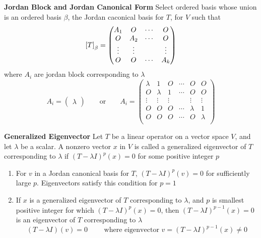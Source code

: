 \documentclass[11pt]{article}
\begin{document}




\begin{defn*}
    \textbf{Jordan Block and Jordan Canonical Form} Select ordered basis whose union is an ordered basis $\beta$, the Jordan caconical basis for $T$, for $V$ such that 
    \[
        \left[ T \right]_{\beta} = 
        \begin{pmatrix}
            A_1 & O & \cdots & O \\
            O & A_2 & \cdots & O \\
            \vdots & \vdots & & \vdots \\
            O & O & \cdots & A_k \\ 
        \end{pmatrix}    
    \]
    where $A_i$ are jordan block corresponding to $\lambda$
    \[
        A_i = 
        \begin{pmatrix}
            \lambda
        \end{pmatrix}
        \qquad 
        \text{or}
        \qquad 
        A_i = 
        \begin{pmatrix}
            \lambda & 1 & O & \cdots & O & O \\
            O & \lambda & 1 & \cdots & O & O \\
            \vdots & \vdots & \vdots & & \vdots & \vdots \\
            O & O & O & \cdots & \lambda & 1 \\ 
            O & O & O & \cdots & O & \lambda \\ 
        \end{pmatrix}
    \]
\end{defn*}


\begin{defn*}
    \textbf{Generalized Eigenvector} Let $T$ be a linear operator on a vector space $V$, and let $\lambda$ be a scalar. A nonzero vector $x$ in $V$ is called a generalized eigenvector of $T$ corresponding to $\lambda$ if $(T-\lambda I)^p(x) = 0$ for some positive integer $p$
    \begin{enumerate}
        \item For $v$ in a Jordan canonical basis for $T$, $(T-\lambda I)^p (v) = 0$ for sufficiently large $p$. Eigenvectors satisfy this condition for $p=1$
        \item If $x$ is a generalized eigenvector of $T$ corresponding to $\lambda$, and $p$ is smallest positive integer for which $(T-\lambda I)^p(x)=0$, then $(T-\lambda I)^{p-1}(x)=0$ is an eigenvector of $T$ corresponding to $\lambda$
        \[
            (T-\lambda I)(v) = 0
            \qquad 
            \text{ where eigenvector }
            v = (T-\lambda I)^{p-1}(x) \neq 0
        \]
    \end{enumerate}
\end{defn*}
\end{document}
